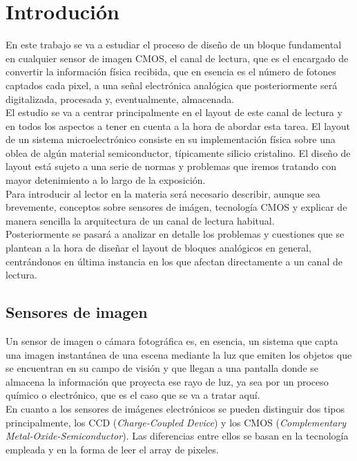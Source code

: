\chapter{Introdución}\label{cap:intro}

En este trabajo se va a estudiar el proceso de diseño de un bloque fundamental
en cualquier sensor de imagen CMOS, el canal de lectura, que es el encargado
de convertir la información física recibida, que en esencia es el número de fotones
captados cada pixel, a una señal electrónica analógica que posteriormente será digitalizada,
procesada y, eventualmente, almacenada.\\

El estudio se va a centrar principalmente en el layout de este canal de
lectura y en todos los aspectos a tener en cuenta a la hora de abordar esta tarea.
El layout de un sistema microelectrónico consiste en su implementación física
sobre una oblea de algún material semiconductor, típicamente silicio cristalino. El
diseño de layout está sujeto a una serie de normas y problemas que iremos tratando
con mayor detenimiento a lo largo de la exposición.\\

Para introducir al lector en la materia será necesario describir, aunque sea
brevemente, conceptos sobre sensores de imágen, tecnología CMOS y explicar de manera
sencilla la arquitectura de un canal de lectura habitual.\\

Posteriormente se pasará a analizar en detalle los problemas y cuestiones que se
plantean a la hora de diseñar el layout de bloques analógicos en general,
centrándonos en última instancia en los que afectan directamente a un canal de lectura.\\

\section{Sensores de imagen}\label{cap:image_sensors}

Un sensor de imagen o cámara fotográfica es, en esencia, un sistema que capta
una imagen instantánea de una escena mediante la luz que emiten los objetos que
se encuentran en su campo de visión y que llegan a una pantalla donde se almacena
la información que proyecta ese rayo de luz, ya sea por un proceso químico
o electrónico, que es el caso que se va a tratar aquí.\\

En cuanto a los sensores de imágenes electrónicos se pueden distinguir dos tipos
principalmente, los CCD (\textit{Charge-Coupled Device}) y los CMOS
(\textit{Complementary Metal-Oxide-Semiconductor}). Las diferencias entre ellos
se basan en la tecnología empleada y en la forma de leer el array de pixeles.\\

